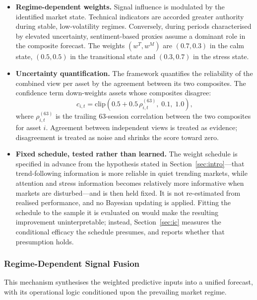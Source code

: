 \begin{itemize}
\item \textbf{Regime-dependent weights.} Signal influence is modulated by the identified
market state. Technical indicators are accorded greater authority during stable,
low-volatility regimes. Conversely, during periods characterised by elevated uncertainty,
sentiment-based proxies assume a dominant role in the composite forecast. The weights
$(w^T, w^M)$ are
$(0.7, 0.3)$ in the calm state, $(0.5, 0.5)$ in the transitional state and $(0.3, 0.7)$
in the stress state.
\item \textbf{Uncertainty quantification.} The framework quantifies the reliability of
the combined view per asset by the agreement between its two composites. The confidence
term down-weights assets whose composites disagree:
\begin{equation}
c_{i,t} = \mathrm{clip}\!\left(0.5 + 0.5\,\rho^{(63)}_{i,t}, \; 0.1, \; 1.0\right),
\end{equation}
where $\rho^{(63)}_{i,t}$ is the trailing 63-session correlation between the two
composites for asset $i$. Agreement between independent views is treated as evidence;
disagreement is treated as noise and shrinks the score toward zero.
\item \textbf{Fixed schedule, tested rather than learned.} The weight schedule is
specified in advance from the hypothesis stated in Section~\ref{sec:intro}---that
trend-following information is more reliable in quiet trending markets, while attention
and stress information becomes relatively more informative when markets are
disturbed---and is then held fixed. It is not re-estimated from realised performance, and
no Bayesian updating is applied. Fitting the schedule to the sample it is evaluated on
would make the resulting improvement uninterpretable; instead,
Section~\ref{sec:ic} measures the conditional efficacy the schedule presumes, and reports
whether that presumption holds.
\end{itemize}

\subsubsection{Regime-Dependent Signal Fusion}

This mechanism synthesises the weighted predictive inputs into a unified forecast, with
its operational logic conditioned upon the prevailing market regime.

